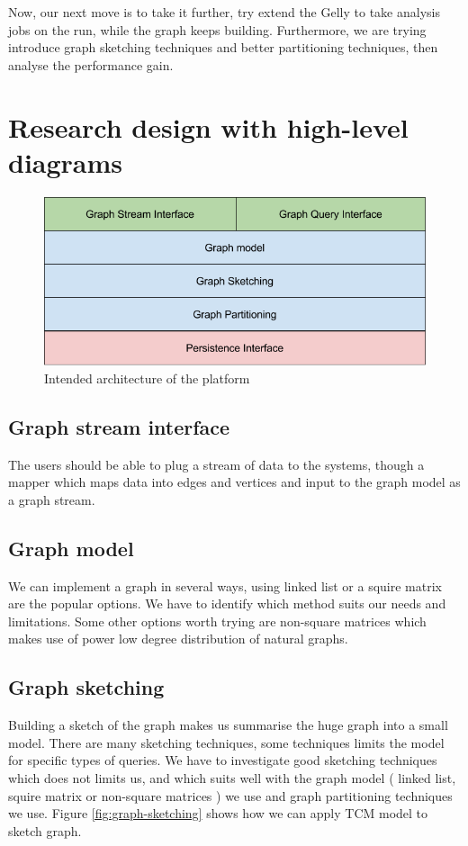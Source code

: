\documentclass[12pt]{article}
\begin{document}
Now, our next move is to take it further, try extend the Gelly to take analysis jobs on the run, while the graph keeps building. Furthermore, we are trying introduce graph sketching techniques and better partitioning techniques, then  analyse the performance gain.

\section{Research design with high-level diagrams}


\begin{figure}[H]
\centering
\includegraphics[scale=0.5]{intended-architecture.png}
\caption{Intended architecture of the platform}
\label{fig:intended-architecture}
\end{figure}

\subsection{Graph stream interface}
The users should be able to plug a stream of data to the systems, though a mapper which maps data into  edges and vertices and input to the graph model as a graph stream. 

\subsection{Graph model}
We can implement a graph in several ways, using linked list or a squire matrix are the popular options. We have to identify which method suits our needs and limitations. Some other options worth trying are non-square matrices which makes use of power low degree distribution of natural graphs. 

\subsection{Graph sketching}
Building a sketch of the graph makes us summarise the huge graph into a small model. There are many sketching techniques, some techniques limits the model for specific types of queries. We have to investigate good sketching techniques which does not limits us, and which suits well with the graph model ( linked list, squire matrix or non-square matrices ) we use and graph partitioning techniques we use. Figure \ref{fig:graph-sketching} shows how we can apply TCM \cite{TCM} model to sketch  graph. 
\end{document}
